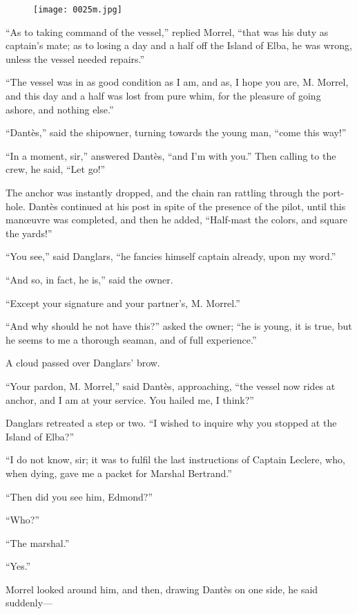 \begin{figure}[h]
\texttt{[image: 0025m.jpg]}
\end{figure}

“As to taking command of the vessel,” replied Morrel, “that was his
duty as captain’s mate; as to losing a day and a half off the Island of
Elba, he was wrong, unless the vessel needed repairs.”

“The vessel was in as good condition as I am, and as, I hope you are,
M. Morrel, and this day and a half was lost from pure whim, for the
pleasure of going ashore, and nothing else.”

“Dantès,” said the shipowner, turning towards the young man, “come this
way!”

“In a moment, sir,” answered Dantès, “and I’m with you.” Then calling
to the crew, he said, “Let go!”

The anchor was instantly dropped, and the chain ran rattling through
the port-hole. Dantès continued at his post in spite of the presence of
the pilot, until this manœuvre was completed, and then he added,
“Half-mast the colors, and square the yards!”

“You see,” said Danglars, “he fancies himself captain already, upon my
word.”

“And so, in fact, he is,” said the owner.

“Except your signature and your partner’s, M. Morrel.”

“And why should he not have this?” asked the owner; “he is young, it is
true, but he seems to me a thorough seaman, and of full experience.”

A cloud passed over Danglars’ brow.

“Your pardon, M. Morrel,” said Dantès, approaching, “the vessel now
rides at anchor, and I am at your service. You hailed me, I think?”

Danglars retreated a step or two. “I wished to inquire why you stopped
at the Island of Elba?”

“I do not know, sir; it was to fulfil the last instructions of Captain
Leclere, who, when dying, gave me a packet for Marshal Bertrand.”

“Then did you see him, Edmond?”

“Who?”

“The marshal.”

“Yes.”

Morrel looked around him, and then, drawing Dantès on one side, he said
suddenly—


